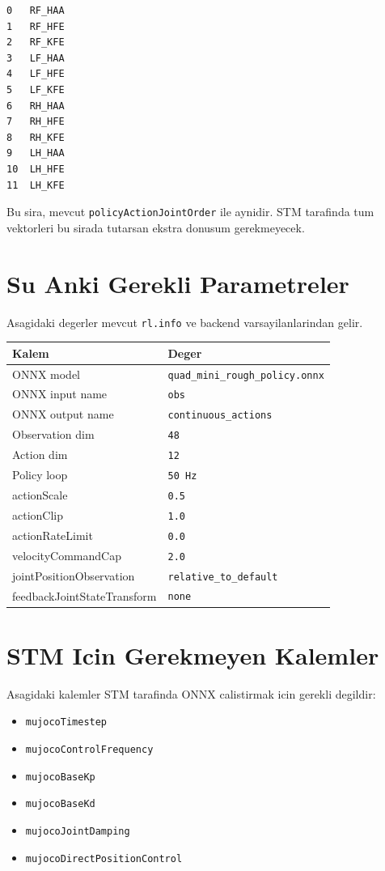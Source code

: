 \documentclass[11pt,a4paper]{article}
\begin{document}
\begin{lstlisting}
0   RF_HAA
1   RF_HFE
2   RF_KFE
3   LF_HAA
4   LF_HFE
5   LF_KFE
6   RH_HAA
7   RH_HFE
8   RH_KFE
9   LH_HAA
10  LH_HFE
11  LH_KFE
\end{lstlisting}

\noindent
Bu sira, mevcut \texttt{policyActionJointOrder} ile aynidir. STM tarafinda tum vektorleri bu sirada tutarsan ekstra donusum gerekmeyecek.

\section{Su Anki Gerekli Parametreler}
Asagidaki degerler mevcut \texttt{rl.info} ve backend varsayilanlarindan gelir.

\begin{center}
\begin{tabular}{ll}
\toprule
Kalem & Deger \\
\midrule
ONNX model & \texttt{quad\_mini\_rough\_policy.onnx} \\
ONNX input name & \texttt{obs} \\
ONNX output name & \texttt{continuous\_actions} \\
Observation dim & \texttt{48} \\
Action dim & \texttt{12} \\
Policy loop & \texttt{50 Hz} \\
actionScale & \texttt{0.5} \\
actionClip & \texttt{1.0} \\
actionRateLimit & \texttt{0.0} \\
velocityCommandCap & \texttt{2.0} \\
jointPositionObservation & \texttt{relative\_to\_default} \\
feedbackJointStateTransform & \texttt{none} \\
\bottomrule
\end{tabular}
\end{center}

\section{STM Icin Gerekmeyen Kalemler}
Asagidaki kalemler STM tarafinda ONNX calistirmak icin gerekli degildir:
\begin{itemize}
  \item \texttt{mujocoTimestep}
  \item \texttt{mujocoControlFrequency}
  \item \texttt{mujocoBaseKp}
  \item \texttt{mujocoBaseKd}
  \item \texttt{mujocoJointDamping}
  \item \texttt{mujocoDirectPositionControl}
\end{itemize}
\end{document}
